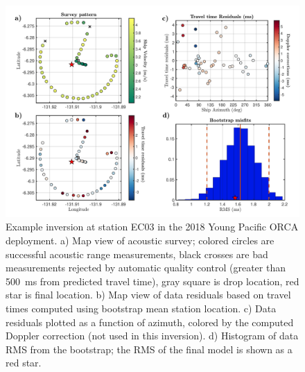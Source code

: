 \documentclass[10pt,titlepage]{article}
\begin{document}
\begin{figure}[h]
\includegraphics[trim=0cm 0cm 0cm 0cm,clip=true,width=\columnwidth]{Figure02.pdf}
\caption{Example inversion at station EC03 in the 2018 Young Pacific ORCA deployment. a) Map view of acoustic survey; colored circles are successful acoustic range measurements, black crosses are bad measurements rejected by automatic quality control (greater than 500~ms from predicted travel time), gray square is drop location, red star is final location. b) Map view of data residuals based on travel times computed using bootstrap mean station location. c) Data residuals plotted as a function of azimuth, colored by the computed Doppler correction (not used in this inversion). d) Histogram of data RMS from the bootstrap; the RMS of the final model is shown as a red star.}
\label{fig:one_sta_real_survey}
\end{figure}

\newpage
\end{document}
